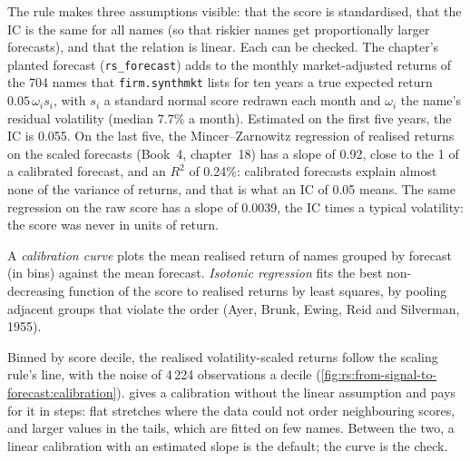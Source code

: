 The rule makes three assumptions visible: that the score is standardised, that the IC is the same for all names (so that riskier names
get proportionally larger forecasts), and that the relation is linear. Each can be checked. The chapter's planted forecast
(\texttt{rs\_forecast}) adds to the monthly market-adjusted returns of the 704 names that \texttt{firm.synthmkt} lists for ten years a true
expected return $0.05\,\omega_i s_i$, with $s_i$ a standard normal score redrawn each month and $\omega_i$ the name's residual volatility
(median 7.7\% a month). Estimated on the first five years, the IC is 0.055. On the last five, the Mincer--Zarnowitz regression of realised
returns on the scaled forecasts (Book~4, chapter~18) has a slope of 0.92, close to the 1 of a calibrated forecast, and an $R^2$ of
0.24\%: calibrated forecasts explain almost none of the variance of returns, and that is what an IC of 0.05 means. The same regression on the
raw score has a slope of 0.0039, the IC times a typical volatility: the score was never in units of return.

\begin{definition}\label{def:rs:from-signal-to-forecast:curve}
A \emph{calibration curve} plots the mean realised return of names grouped by forecast (in bins) against the mean
forecast. \emph{Isotonic regression} fits the best non-decreasing function of the score to realised returns by least
squares, by pooling adjacent groups that violate the order (Ayer, Brunk, Ewing, Reid and Silverman, 1955).
\end{definition}

Binned by score decile, the realised volatility-scaled returns follow the scaling rule's line, with the noise of 4\,224 observations a decile
(\cref{fig:rs:from-signal-to-forecast:calibration}).  gives a calibration without the linear assumption and pays for it in
steps: flat stretches where the data could not order neighbouring scores, and larger values in the tails, which are fitted on few names.
Between the two, a linear calibration with an estimated slope is the default; the curve is the check.

